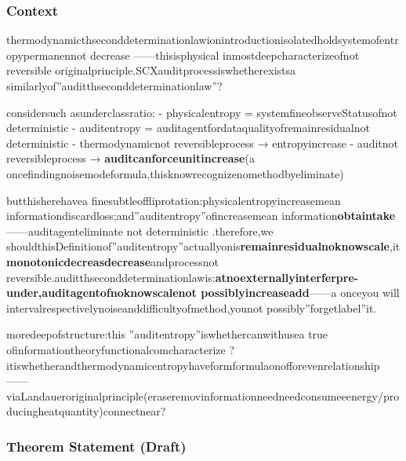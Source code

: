 \documentclass[
  12pt,
]{article}
\begin{document}
\subsubsection{Context}\label{ux8bedux5883-1}

thermodynamicthseconddeterminationlawionintroductionisolatedholdsystemofentropypermanennot decrease ------thisisphysical inmostdeepcharacterizeofnot reversible originalprinciple.SCXauditprocessiswhetherexistsa  similarlyof''auditthseconddeterminationlaw''?

 considersuch asunderclassratio: - physicalentropy = systemfineobserveStatusofnot deterministic  - auditentropy =
auditagentfordataqualityofremainresidualnot deterministic  - thermodynamicnot reversibleprocess → entropyincrease -
auditnot reversibleprocess →
\textbf{auditcanforceunitincrease}(a oncefindingnoisemodeformula,thisknowrecognizenomethodbyeliminate)

butthisherehavea  finesubtleoffliprotation:physicalentropyincreasemean  informationdiscardloss;and''auditentropy''ofincreasemean  information\textbf{obtaintake}------auditagenteliminate not deterministic .therefore,we shouldthisDefinitionof''auditentropy''actuallyonis\textbf{remainresidualnoknowscale},it\textbf{monotonicdecreasdecrease}andprocessnot reversible.auditthseconddeterminationlawis:\textbf{atnoexternallyinterferpre-under,auditagentofnoknowscalenot possiblyincreaseadd}------a onceyou will intervalrespectivelynoiseanddifficultyofmethod,younot possibly''forgetlabel''it.

moredeepofstructure:this ''auditentropy''iswhethercanwithusea  true ofinformationtheoryfunctionalcomcharacterize ?itiswhetherandthermodynamicentropyhaveformformulaonofforevenrelationship------viaLandaueroriginalprinciple(eraseremovinformationneedneedconsumeeenergy/producingheatquantity)connectnear?

\subsubsection{Theorem Statement (Draft)}\label{ux5b9aux7406ux9648ux8ff0ux8349ux6848-1}
\end{document}
